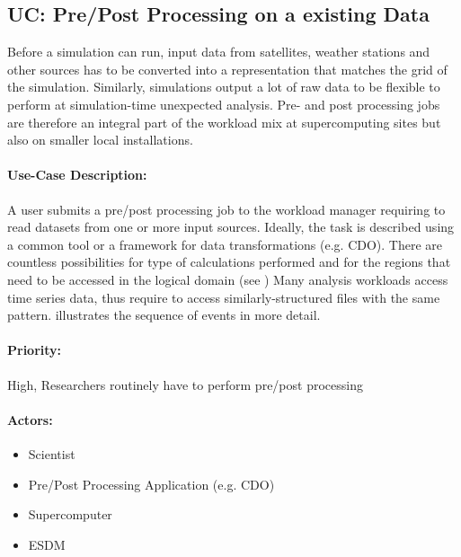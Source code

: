 \subsection{UC: Pre/Post Processing on a existing Data}
\label{uc: pre + post processing}

Before a simulation can run, input data from satellites, weather stations and other sources has to be converted into a representation that matches the grid of the simulation.
Similarly, simulations output a lot of raw data to be flexible to perform at simulation-time unexpected analysis.
Pre- and post processing jobs are therefore an integral part of the workload mix at supercomputing sites but also on smaller local installations.


\paragraph{Use-Case Description:}
A user submits a pre/post processing job to the workload manager requiring to read datasets from one or more input sources.
Ideally, the task is described using a common tool or a framework for data transformations (e.g. CDO).
There are countless possibilities for type of calculations performed and for the regions that need to be accessed in the logical domain (see )
Many analysis workloads access time series data, thus require to access similarly-structured files with the same pattern.
 illustrates the sequence of events in more detail.

\paragraph{Priority:} High, Researchers routinely have to perform pre/post processing

\paragraph{Actors:}
\begin{itemize}
	\item Scientist
	\item Pre/Post Processing Application (e.g. CDO)
	\item Supercomputer
	\item ESDM
\end{itemize}


